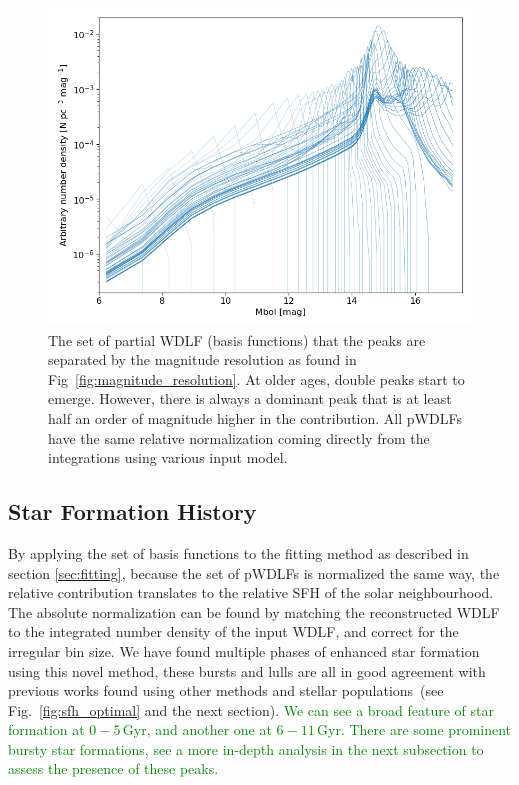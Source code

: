 \documentclass[fleqn,usenatbib]{mnras}
\begin{document}
\begin{figure}
    \includegraphics[width=\columnwidth]{figures/fig_04_basis_pwdlf.png}
    \caption{The set of partial WDLF (basis functions) that the peaks are
    separated by the magnitude resolution as found in
    Fig~\ref{fig:magnitude_resolution}. At older ages, double peaks start to
    emerge. However, there is always a dominant peak that is at least half an
    order of magnitude higher in the contribution. All pWDLFs have the same
    relative normalization coming directly from the integrations using various
    input model.}
    \label{fig:basis_pwdlf}
\end{figure}

\subsection{Star Formation History}
\label{sec:sfh}
By applying the set of basis functions to the fitting method as described in
section \textsection\ref{sec:fitting}, because the set of pWDLFs is
normalized the same way, the relative contribution translates to the relative
SFH of the solar neighbourhood. The absolute normalization can be found by
matching the reconstructed WDLF to the integrated number density of the input
WDLF, and correct for the irregular bin size. We have found multiple phases of
enhanced star formation using this novel method, these bursts and lulls are all
in good agreement with previous works found using other methods and stellar 
populations~(see Fig.~\ref{fig:sfh_optimal} and the next section).
\textcolor{green}{We can see a broad feature of star formation at $0-5$\,Gyr,
and another one at $6-11$\,Gyr. There are some prominent bursty star
formations, see a more in-depth analysis in the next subsection to assess the
presence of these peaks.
}
\end{document}
